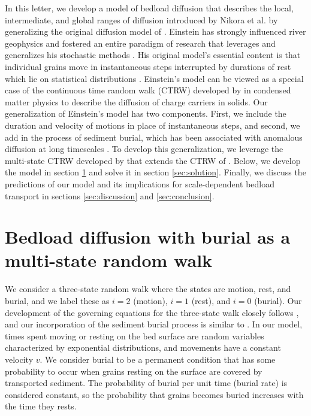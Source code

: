 \documentclass[]{agujournal2018}
\begin{document}
In this letter, we develop a model of bedload diffusion that describes the local, intermediate, and global ranges of diffusion introduced by Nikora et al. by generalizing the original diffusion model of \citet{Einstein1937}.
Einstein has strongly influenced river geophysics and fostered an entire paradigm of research that leverages and generalizes his stochastic methods \citep[e.g.][]{Hubbell1964, Yano1969, Yang1971, Gordon1972, Nakagawa1976}.
His original model's essential content is that individual grains move in instantaneous steps interrupted by durations of rest which lie on statistical distributions \citep{Hassan1991}.
Einstein's model can be viewed as a special case of the continuous time random walk (CTRW) developed by \citet{Montroll1965} in condensed matter physics to describe the diffusion of charge carriers in solids.
Our generalization of Einstein's model has two components.
First, we include the duration and velocity of motions in place of instantaneous steps, and second, we add in the process of sediment burial, which has been associated with anomalous diffusion at long timescales \citep[e.g.][]{Bradley2017,Martin2014}.
To develop this generalization, we leverage the multi-state CTRW developed by \citet{Weiss1976, Weiss1994} that extends the CTRW of \citet{Montroll1965}.
Below, we develop the model in section \ref{sec:model} and solve it in section \ref{sec:solution}. Finally, we discuss the predictions of our model and its implications for scale-dependent bedload transport in sections \ref{sec:discussion} and \ref{sec:conclusion}.

\section{Bedload diffusion with burial as a multi-state random walk}
\label{sec:model}
We consider a three-state random walk where the states are motion, rest, and burial, and we label these as $i=2$ (motion), $i=1$ (rest), and $i=0$ (burial).
Our development of the governing equations for the three-state walk closely follows \citet{Weiss1994}, and our incorporation of the sediment burial process is similar to \citet{Schmidt2007}.
In our model, times spent moving or resting on the bed surface are random variables characterized by exponential distributions, and movements have a constant velocity $v$.
We consider burial to be a permanent condition that has some probability to occur when grains resting on the surface are covered by transported sediment.
The probability of burial per unit time (burial rate) is considered constant, so the probability that grains becomes buried increases with the time they rests.
\end{document}
